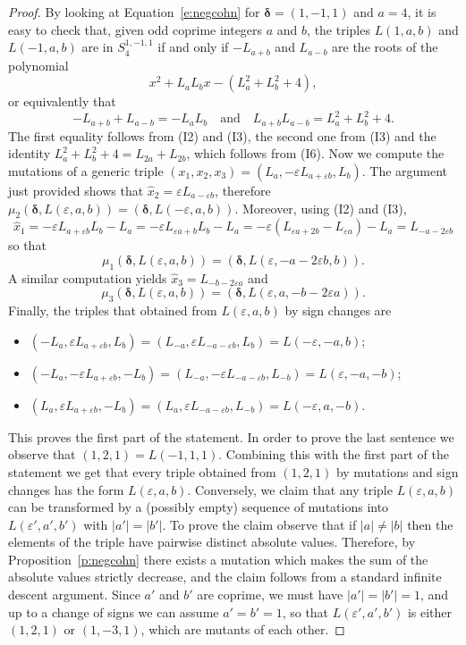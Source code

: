 \documentclass[11pt,a4paper]{amsart}
\newcommand{\de}{\delta}
\newcommand{\ep}{\varepsilon}
\newcommand{\bde}{\bm{\de}}
\theoremstyle{definition}
\numberwithin{equation}{section}
\begin{document}
\begin{proof}
By looking at Equation~\eqref{e:negcohn} for $\bde = (1,-1,1)$ and $a=4$,  
it is easy to check that, given odd coprime integers $a$ and $b$, the triples 
$L(1,a,b)$ and $L(-1,a,b)$ are in $S_4^{1,-1,1}$ if and only if 
$-L_{a+b}$ and $L_{a-b}$ are the roots of the polynomial 
\[
x^2+L_a L_b x-(L_a^2+L_b^2+4),
\]
or equivalently that
\[
-L_{a+b}+L_{a-b}=-L_aL_b \quad \text{and} \quad L_{a+b}L_{a-b}=L_a^2+L_b^2+4. 
\]
The first equality follows from (I2) and (I3), the second one from (I3) 
and the identity $L_a^2+L_b^2+4=L_{2a}+L_{2b}$, which follows from (I6). 
Now we compute the mutations of a generic triple 
$(x_1,x_2,x_3)=(L_a,-\ep L_{a+ \ep b},L_b)$. The argument just provided shows that 
$\hat x_2=\ep L_{a-\ep b}$, therefore $\mu_2(\bde, L(\ep,a,b))=(\bde, L(-\ep,a,b))$. 
Moreover, using (I2) and (I3), 
\[
\hat x_1=-\ep L_{a+\ep b}L_b-L_a=-\ep L_{\ep a + b}L_b-L_a=-\ep(L_{\ep a+2b}-L_{\ep a})-L_a=L_{-a-2\ep b}
\]
so that 
\[
\mu_1(\bde, L(\ep,a,b))=(\bde, L(\ep,-a-2\ep b,b)).
\]
A similar computation yields $\hat x_3=L_{-b-2\ep a}$ and 
\[
\mu_3(\bde, L(\ep,a,b))=(\bde, L(\ep,a,-b-2\ep a)).
\]
Finally, the triples that obtained from $L(\ep,a,b)$ by sign changes are
\begin{itemize}
    \item $(-L_a,\ep L_{a+\ep b},L_b)=(L_{-a},\ep L_{-a-\ep b},L_b)=L(-\ep,-a,b)$;
    \item $(-L_a,-\ep L_{a+\ep b},-L_b)=(L_{-a},-\ep L_{-a-\ep b},L_{-b})=L(\ep,-a,-b)$;
    \item $(L_a,\ep L_{a+\ep b},-L_b)=(L_a,\ep L_{-a-\ep b},L_{-b})=L(-\ep,a,-b)$.
\end{itemize}
This proves the first part of the statement. In order to prove the last sentence we observe that $(1,2,1)=L(-1,1,1)$. 
Combining this with the first part of the statement we get that every triple obtained from $(1,2,1)$ by mutations and sign changes 
has the form $L(\ep,a,b)$. Conversely, we claim that any triple $L(\ep,a,b)$ can be transformed by a 
(possibly empty) sequence of mutations into $L(\ep',a',b')$ with $|a'|=|b'|$. To prove the 
claim observe that if $|a| \neq |b|$ then the elements of the triple have pairwise distinct absolute 
values. Therefore, by Proposition~\ref{p:negcohn} there exists a mutation which makes 
the sum of the absolute values strictly decrease, and the claim follows from a standard 
infinite descent argument. Since $a'$ and $b'$ are coprime, we must have $|a'|=|b'|=1$, 
and up to a change of signs we can assume $a'=b'=1$, so that $L(\ep',a',b')$ is 
either $(1,2,1)$ or $(1,-3,1)$, which are mutants of each other.
\end{proof}
\end{document}
